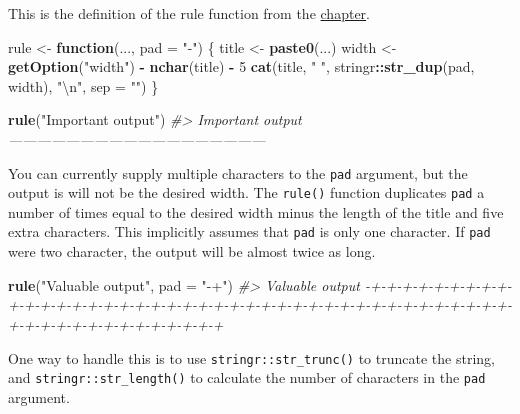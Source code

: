 \documentclass[]{book}
\newenvironment{Shaded}{\begin{snugshade}}{\end{snugshade}}
\newcommand{\CharTok}[1]{\textcolor[rgb]{0.31,0.60,0.02}{#1}}
\newcommand{\CommentTok}[1]{\textcolor[rgb]{0.56,0.35,0.01}{\textit{#1}}}
\newcommand{\ControlFlowTok}[1]{\textcolor[rgb]{0.13,0.29,0.53}{\textbf{#1}}}
\newcommand{\DataTypeTok}[1]{\textcolor[rgb]{0.13,0.29,0.53}{#1}}
\newcommand{\DecValTok}[1]{\textcolor[rgb]{0.00,0.00,0.81}{#1}}
\newcommand{\KeywordTok}[1]{\textcolor[rgb]{0.13,0.29,0.53}{\textbf{#1}}}
\newcommand{\NormalTok}[1]{#1}
\newcommand{\OperatorTok}[1]{\textcolor[rgb]{0.81,0.36,0.00}{\textbf{#1}}}
\newcommand{\StringTok}[1]{\textcolor[rgb]{0.31,0.60,0.02}{#1}}
\theoremstyle{plain}
\theoremstyle{remark}
\begin{document}
This is the definition of the rule function from the \href{http://r4ds.had.co.nz/functions.html}{chapter}.

\begin{Shaded}
\begin{Highlighting}[]
\NormalTok{rule <-}\StringTok{ }\ControlFlowTok{function}\NormalTok{(..., }\DataTypeTok{pad =} \StringTok{"-"}\NormalTok{) \{}
\NormalTok{  title <-}\StringTok{ }\KeywordTok{paste0}\NormalTok{(...)}
\NormalTok{  width <-}\StringTok{ }\KeywordTok{getOption}\NormalTok{(}\StringTok{"width"}\NormalTok{) }\OperatorTok{-}\StringTok{ }\KeywordTok{nchar}\NormalTok{(title) }\OperatorTok{-}\StringTok{ }\DecValTok{5}
  \KeywordTok{cat}\NormalTok{(title, }\StringTok{" "}\NormalTok{, stringr}\OperatorTok{::}\KeywordTok{str_dup}\NormalTok{(pad, width), }\StringTok{"}\CharTok{\textbackslash{}n}\StringTok{"}\NormalTok{, }\DataTypeTok{sep =} \StringTok{""}\NormalTok{)}
\NormalTok{\}}
\end{Highlighting}
\end{Shaded}

\begin{Shaded}
\begin{Highlighting}[]
\KeywordTok{rule}\NormalTok{(}\StringTok{"Important output"}\NormalTok{)}
\CommentTok{#> Important output ------------------------------------------------------}
\end{Highlighting}
\end{Shaded}

You can currently supply multiple characters to the \texttt{pad} argument, but the output is
will not be the desired width. The \texttt{rule()} function duplicates \texttt{pad} a number of times
equal to the desired width minus the length of the title and five extra characters.
This implicitly assumes that \texttt{pad} is only one character. If \texttt{pad} were two character,
the output will be almost twice as long.

\begin{Shaded}
\begin{Highlighting}[]
\KeywordTok{rule}\NormalTok{(}\StringTok{"Valuable output"}\NormalTok{, }\DataTypeTok{pad =} \StringTok{"-+"}\NormalTok{)}
\CommentTok{#> Valuable output -+-+-+-+-+-+-+-+-+-+-+-+-+-+-+-+-+-+-+-+-+-+-+-+-+-+-+-+-+-+-+-+-+-+-+-+-+-+-+-+-+-+-+-+-+-+-+-+-+-+-+-+-+-+-+}
\end{Highlighting}
\end{Shaded}

One way to handle this is to use \texttt{stringr::str\_trunc()} to truncate the string,
and \texttt{stringr::str\_length()} to calculate the number of characters in the \texttt{pad} argument.
\end{document}
